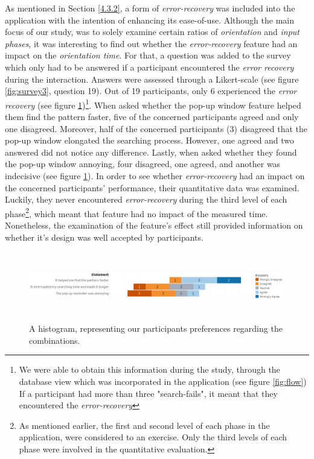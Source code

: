 As mentioned in Section \ref{4.3.2}, a form of \textit{error-recovery} was included into the application with the intention of enhancing its ease-of-use. Although the main focus of our study, was to solely examine certain ratios of \textit{orientation} and \textit{input phases}, it was interesting to find out whether the \textit{error-recovery} feature had an impact on the \textit{orientation time}. For that, a question was added to the survey which only had to be answered if a participant encountered the \textit{error recovery} during the interaction. Answers were assessed through a Likert-scale (see figure \ref{fig:survey3}, question 19). Out of 19 participants, only 6 experienced the \textit{error recovery} (see figure \ref{fig:error})\footnote{We were able to obtain this information during the study, through the database view which was incorporated in the application (see figure \ref{fig:flow}) If a participant had more than three "search-fails", it meant that they encountered the \textit{error-recovery}}. When asked whether the pop-up window feature helped them find the pattern faster, five of the concerned participants agreed and only one disagreed. Moreover, half of the concerned participants (3) disagreed that the pop-up window elongated the searching process. However, one agreed and two answered did not notice any difference. Lastly, when asked whether they found the pop-up window annoying, four disagreed, one agreed, and another was indecisive (see figure \ref{fig:error}). In order to see whether \textit{error-recovery} had an impact on the concerned participants' performance, their quantitative data was examined. Luckily, they never encountered \textit{error-recovery} during the third level of each phase\footnote{As mentioned earlier, the first and second level of each phase in the application, were considered to an exercise. Only the third levels of each phase were involved in the quantitative evaluation.}, which meant that feature had no impact of the measured time. Nonetheless, the examination of the feature's effect still provided information on whether it's design was well accepted by participants. \\

\begin{figure}[t!]
\centering
\includegraphics[width=15cm, height=3cm]{Chapters/graphics/ErrorRecovery.png}
\caption{A histogram, representing our participants preferences regarding the combinations.}
\label{fig:error}
\end{figure}





